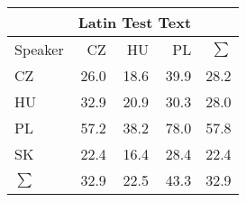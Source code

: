 \begin{tabular}{l|rrr|r}
\hline
 & \multicolumn{3}{c}{Latin Test Text} & \\
\hline
 Speaker   &   CZ &   HU &   PL &   $\sum$ \\
\hline
 CZ        & 26.0 & 18.6 & 39.9 &     28.2 \\
 HU        & 32.9 & 20.9 & 30.3 &     28.0 \\
 PL        & 57.2 & 38.2 & 78.0 &     57.8 \\
 SK        & 22.4 & 16.4 & 28.4 &     22.4 \\
\hline
 $\sum$   & 32.9 & 22.5 & 43.3 &     32.9 \\
\hline
\end{tabular}